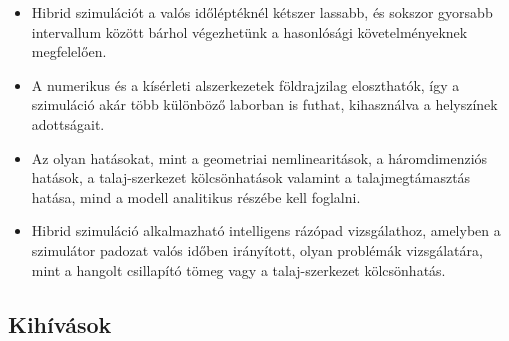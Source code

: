\begin{itemize}
\item Hibrid szimulációt a valós időléptéknél kétszer lassabb, és sokszor gyorsabb intervallum között bárhol végezhetünk a hasonlósági követelményeknek megfelelően.
\item A numerikus és a kísérleti alszerkezetek földrajzilag eloszthatók, így a szimuláció akár több különböző laborban is futhat, kihasználva a helyszínek adottságait. 
\item Az olyan hatásokat, mint a geometriai nemlinearitások, a háromdimenziós hatások, a talaj-szerkezet kölcsönhatások valamint a talajmegtámasztás hatása, mind a modell analitikus részébe kell foglalni.
\item Hibrid szimuláció alkalmazható intelligens rázópad vizsgálathoz, amelyben a szimulátor padozat valós időben irányított, olyan problémák vizsgálatára, mint a hangolt csillapító tömeg vagy a talaj-szerkezet kölcsönhatás.
\end{itemize} 

\subsection{Kihívások}

{\ }


